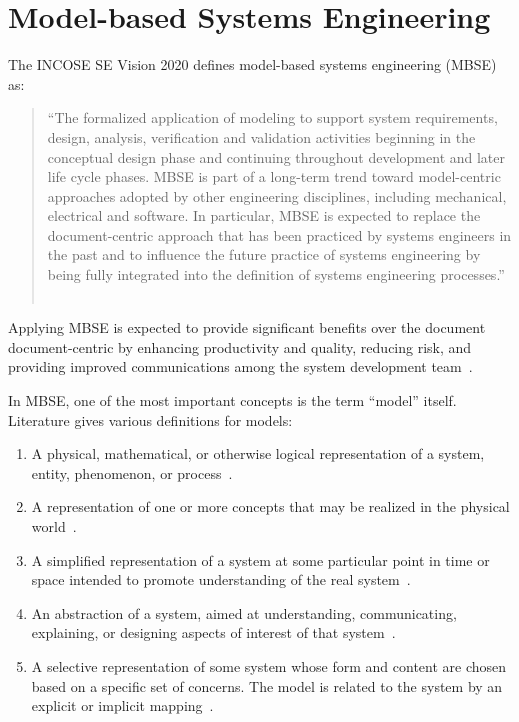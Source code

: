 \section{Model-based Systems Engineering}\label{sec:mbse}

The INCOSE SE Vision 2020 defines model-based systems engineering (MBSE) as:

\blockquote{``The formalized application of modeling to support system requirements, design, analysis, verification and validation activities beginning in the conceptual design phase and continuing throughout development and later life cycle phases. MBSE is part of a long-term trend toward model-centric approaches adopted by other engineering disciplines, including mechanical, electrical and software. In particular, MBSE is expected to replace the document-centric approach that has been practiced by systems engineers in the past and to influence the future practice of systems engineering by being fully integrated into the definition of systems engineering processes.'' ~\cite{incose-systems-engineering-2020}}

Applying MBSE is expected to provide significant benefits over the document document-centric by enhancing productivity and quality, reducing risk, and providing improved communications among the system development team~\cite{omgwiki}.

In MBSE, one of the most important concepts is the term ``model'' itself. Literature gives various definitions for models:

\begin{enumerate}
	\item A physical, mathematical, or otherwise logical representation of a system, entity, phenomenon, or process~\cite{DoD_modeling_and_simulation}.\label{item:dod}
	\item A representation of one or more concepts that may be realized in the physical world~\cite{sysml_practical_guide}.
	\item A simplified representation of a system at some particular point in time or space intended to promote understanding of the real system~\cite{modsim}.
	\item An abstraction of a system, aimed at understanding, communicating, explaining, or designing aspects of interest of that system~\cite{object-process-methodology}.
	\item A selective representation of some system whose form and content are chosen based on a specific set of concerns. The model is related to the system by an explicit or implicit mapping~\cite{ORMSC/2010-09-06}.
\end{enumerate}

